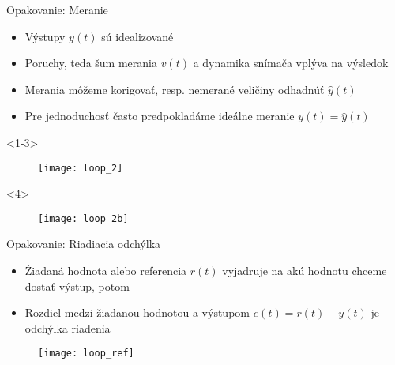 \begin{frame}{Opakovanie: Meranie}
  \begin{itemize}
    \item<1-> Výstupy $y(t)$ sú idealizované
    \item<2-> Poruchy, teda šum merania $v(t)$ a dynamika snímača vplýva na výsledok
    \item<3-> Merania môžeme korigovať, resp. nemerané veličiny odhadnúť $\hat{y}(t)$
    \item<4-> Pre jednoduchosť často predpokladáme ideálne meranie ${y}(t)=\hat{y}(t)$
  \end{itemize}

\begin{onlyenv}<1-3>
\begin{figure}
\centering
  \texttt{[image: loop\_2]}\\
\end{figure}
\end{onlyenv}


\begin{onlyenv}<4>
\begin{figure}
\centering
  \texttt{[image: loop\_2b]}\\
\end{figure}
\end{onlyenv}
\end{frame}

\begin{frame}{Opakovanie: Riadiacia odchýlka}
  \begin{itemize}
    \item<1-> Žiadaná hodnota alebo referencia  $r(t)$ vyjadruje na akú hodnotu chceme dostať výstup, potom
    \item<2-> Rozdiel medzi žiadanou hodnotou a výstupom $e(t)=r(t)-y(t)$ je odchýlka riadenia 
  \end{itemize}

\begin{figure}
\centering
  \texttt{[image: loop\_ref]}\\
\end{figure}
\end{frame}


